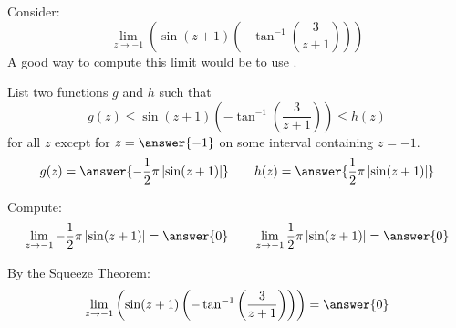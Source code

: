\documentclass{ximera}
\author{Bart Snapp}
\begin{document}
\begin{exercise}


Consider:
\[
\lim_{z\to -1} \left(\sin (z+1) \left(-\tan ^{-1}\left(\frac{3}{z+1}\right)\right)\right)
\]
A good way to compute this limit would be to use .
\begin{exercise}
List two functions $g$ and $h$ such that
\[
g(z)\le \sin (z+1) \left(-\tan ^{-1}\left(\frac{3}{z+1}\right)\right) \le h(z)
\]
for all $z$ except for $z=\answer{-1}$ on some interval containing $z=-1$.
\[
g(z)=\answer{-\frac{1}{2} \pi  \left| \sin (z+1)\right|}\qquad h(z) =\answer{\frac{1}{2} \pi  \left| \sin (z+1)\right|}
\]
\begin{exercise}
Compute:
\[
\lim_{z \to -1}-\frac{1}{2} \pi  \left| \sin (z+1)\right| = \answer{0}\qquad \lim_{z\to -1}\frac{1}{2} \pi  \left| \sin (z+1)\right| = \answer{0}
\]
\begin{exercise}
By the Squeeze Theorem:
\[
\lim_{z\to -1} \left(\sin (z+1) \left(-\tan ^{-1}\left(\frac{3}{z+1}\right)\right)\right) = \answer{0}
\]
\end{exercise}
\end{exercise}
\end{exercise}
\end{exercise}
\end{document}
